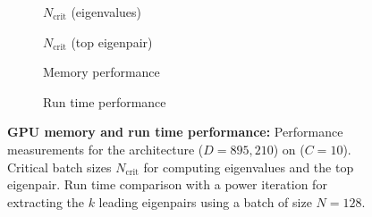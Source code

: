 \begin{figure}[tb]
  \centering
  \begin{subfigure}[t]{\linewidth}
    \centering
    \caption{Memory performance}
    \label{vivit::subfig:performance-cifar10-3c3d-cuda_main1}
    \begin{minipage}[t]{0.49\linewidth}
      \centering
      \begin{footnotesize}
        $N_{\text{crit}}$ (eigenvalues)

        \vspace{0.1\baselineskip}
        
      \end{footnotesize}
    \end{minipage}
    \hfill
    \begin{minipage}[t]{0.49\linewidth}
      \centering
      \begin{footnotesize}
        $N_{\text{crit}}$ (top eigenpair)

        \vspace{0.1\baselineskip}
        
      \end{footnotesize}
    \end{minipage}
  \end{subfigure}
  \vspace{1ex}
  \begin{subfigure}[t]{\linewidth}
    \centering
    \caption{Run time performance}
    \label{vivit::subfig:performance-cifar10-3c3d-cuda_main2}
    
    \tikzexternalenable
    
    \tikzexternaldisable
  \end{subfigure}
  \vspace{-2ex}
  \caption{\textbf{GPU memory and run time performance:} Performance
    measurements for the \threecthreed architecture ($D = 895,\!210$) on
    \cifarten ($C=10$). 
    Critical batch sizes $N_{\text{crit}}$ for computing eigenvalues and the top
    eigenpair.  Run time
    comparison with a power iteration for extracting the $k$ leading eigenpairs
    using a batch of size $N=128$.
  }\label{vivit::fig:performance-cifar10-3c3d-cuda_main}
\end{figure}

